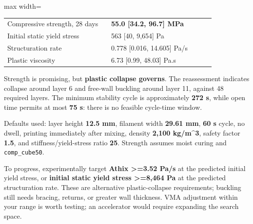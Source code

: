 \begin{agentbox}
\begin{adjustbox}{max width=\linewidth}
\begin{tabular}{p{0.47\linewidth}p{0.47\linewidth}}
Compressive strength, 28 days & \textbf{55.0 [34.2, 96.7] MPa} \\
Initial static yield stress & 563 [40, 9,654] Pa \\
Structuration rate & 0.778 [0.016, 14.605] Pa/s \\
Plastic viscosity & 6.73 [0.99, 48.03] Pa.s \\
\end{tabular}\end{adjustbox}\par\smallskip
\par
Strength is promising, but \textbf{plastic collapse governs}. The reassessment indicates collapse around layer 6 and free-wall buckling around layer 11, against 48 required layers. The minimum stability cycle is approximately \textbf{272 s}, while open time permits at most \textbf{75 s}: there is no feasible cycle-time window.\par
\par
Defaults used: layer height \textbf{12.5 mm}, filament width \textbf{29.61 mm}, \textbf{60 s} cycle, no dwell, printing immediately after mixing, density \textbf{2,100 kg/m\textasciicircum{}3}, safety factor \textbf{1.5}, and stiffness/yield-stress ratio \textbf{25}. Strength assumes moist curing and \texttt{comp\_cube50}.\par
\par
To progress, experimentally target \textbf{Athix >=3.52 Pa/s} at the predicted initial yield stress, or \textbf{initial static yield stress >=8,464 Pa} at the predicted structuration rate. These are alternative plastic-collapse requirements; buckling still needs bracing, returns, or greater wall thickness. VMA adjustment within your range is worth testing; an accelerator would require expanding the search space.\par
\par
[...]\par
\end{agentbox}
